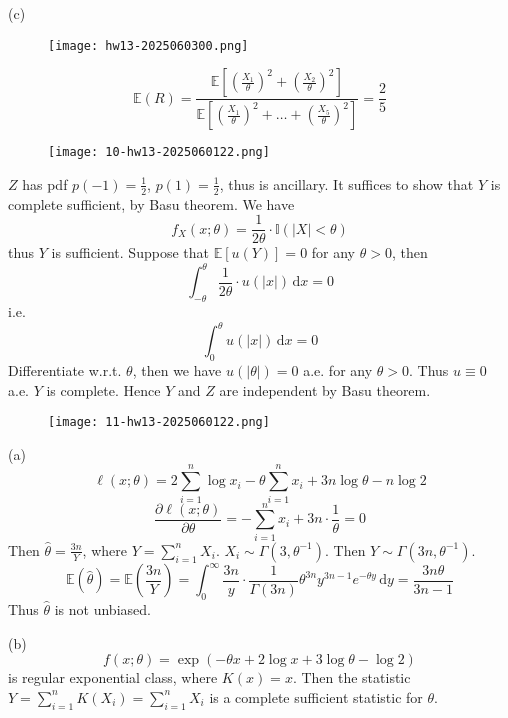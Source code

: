 (c)
\begin{figure}[H]
\centering
\texttt{[image: hw13-2025060300.png]}
\label{}
\end{figure}
\[
\mathbb{E}(R) =\frac{\mathbb{E}\left[ \left( \frac{X_1}{\theta} \right)^2+\left( \frac{X_2}{\theta} \right)^2 \right]}{\mathbb{E}\left[ \left( \frac{X_1}{\theta} \right)^2+\dots+\left( \frac{X_5}{\theta} \right)^2 \right]}  =\frac{2}{5}
\]
\begin{exercise}
\begin{figure}[H]
\centering
\texttt{[image: 10-hw13-2025060122.png]}
\label{}
\end{figure}
\end{exercise}
$Z$ has pdf $p(-1)=\frac{1}{2}$, $p(1)=\frac{1}{2}$, thus is ancillary. It suffices to show that $Y$ is complete sufficient, by Basu theorem. We have
\[
f_{X}(x;\theta)=\frac{1}{2\theta}\cdot \mathbb{I}(\lvert X \rvert <\theta)
\]
thus $Y$ is sufficient. Suppose that $\mathbb{E}[u(Y)]=0$ for any $\theta>0$, then
\[
\int_{-\theta}^{\theta} \frac{1}{2\theta}\cdot u(\lvert x \rvert ) \, \mathrm{d}x =0
\]
i.e.
\[
\int_{0}^{\theta} u(\lvert x \rvert ) \, \mathrm{d}x=0
\]
Differentiate w.r.t. $\theta$, then we have $u(\lvert \theta \rvert)=0$ a.e. for any $\theta>0$. Thus $u\equiv0$ a.e. $Y$ is complete. Hence $Y$ and $Z$ are independent by Basu theorem.

\begin{exercise}
\begin{figure}[H]
\centering
\texttt{[image: 11-hw13-2025060122.png]}
\label{}
\end{figure}
\end{exercise}
(a)
\[
\ell(x;\theta)=2\sum_{i=1}^{n} \log x_i-\theta \sum_{i=1}^{n} x_i+3n\log\theta-n\log2
\]
\[
\frac{ \partial \ell(x;\theta) }{ \partial \theta }=-\sum_{i=1}^{n} x_i+3n\cdot\frac{1}{\theta}=0
\]
Then $\widehat{\theta}=\frac{3n}{Y}$, where $Y=\sum_{i=1}^{n}X_i$. $X_i\sim\Gamma(3,\theta ^{-1})$. Then $Y\sim\Gamma(3n,\theta ^{-1})$.
\[
\mathbb{E}(\widehat{\theta})=\mathbb{E}\left( \frac{3n}{Y} \right)=\int_{0}^{\infty} \frac{3n}{y}\cdot\frac{1}{\Gamma(3n)}\theta^{3n}y^{3n-1}e^{ -\theta y } \, \mathrm{d}y=\frac{3n\theta}{3n-1}
\]
Thus $\widehat{\theta}$ is not unbiased.

(b)
\[
f(x;\theta)=\exp(-\theta x+2\log x+3\log\theta-\log2)
\]
is regular exponential class, where $K(x)=x$. Then the statistic $Y=\sum_{i=1}^{n}K(X_i)=\sum_{i=1}^{n}X_i$ is a complete sufficient statistic for $\theta$.

